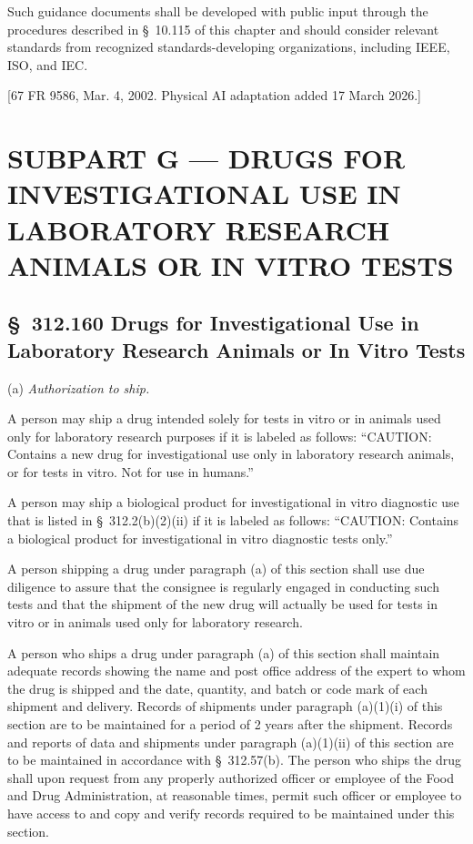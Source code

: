 \documentclass[11pt]{article}
\begin{document}
Such guidance documents shall be developed with public input through the procedures described in \S~10.115 of this chapter and should consider relevant standards from recognized standards-developing organizations, including IEEE, ISO, and IEC.

[67 FR 9586, Mar. 4, 2002. Physical AI adaptation added 17 March 2026.]

\clearpage

\section{SUBPART G --- DRUGS FOR INVESTIGATIONAL USE IN LABORATORY RESEARCH ANIMALS OR IN VITRO TESTS}

\subsection{\S~312.160 Drugs for Investigational Use in Laboratory Research Animals or In Vitro Tests}

(a) \textit{Authorization to ship.}

\begin{description}[leftmargin=0.5cm,style=sameline]
\item[(1)] \hfill
\begin{description}[leftmargin=0.8cm,style=sameline]
\item[(i)] A person may ship a drug intended solely for tests in vitro or in animals used only for laboratory research purposes if it is labeled as follows: ``CAUTION: Contains a new drug for investigational use only in laboratory research animals, or for tests in vitro. Not for use in humans.''
\item[(ii)] A person may ship a biological product for investigational in vitro diagnostic use that is listed in \S~312.2(b)(2)(ii) if it is labeled as follows: ``CAUTION: Contains a biological product for investigational in vitro diagnostic tests only.''
\end{description}
\item[(2)] A person shipping a drug under paragraph (a) of this section shall use due diligence to assure that the consignee is regularly engaged in conducting such tests and that the shipment of the new drug will actually be used for tests in vitro or in animals used only for laboratory research.
\item[(3)] A person who ships a drug under paragraph (a) of this section shall maintain adequate records showing the name and post office address of the expert to whom the drug is shipped and the date, quantity, and batch or code mark of each shipment and delivery. Records of shipments under paragraph (a)(1)(i) of this section are to be maintained for a period of 2 years after the shipment. Records and reports of data and shipments under paragraph (a)(1)(ii) of this section are to be maintained in accordance with \S~312.57(b). The person who ships the drug shall upon request from any properly authorized officer or employee of the Food and Drug Administration, at reasonable times, permit such officer or employee to have access to and copy and verify records required to be maintained under this section.
\end{description}
\end{document}
